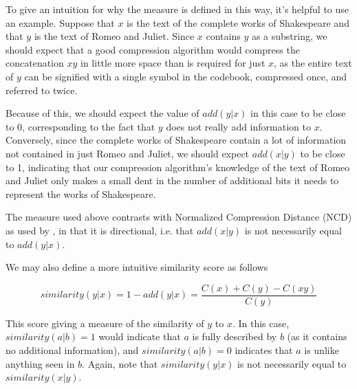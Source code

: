To give an intuition for why the measure is defined in this way, it's helpful to use an example. Suppose that $x$ is the text of the complete works of Shakespeare and that $y$ is the text of Romeo and Juliet. Since $x$ contains $y$ as a substring, we should expect that a good compression algorithm would compress the concatenation $xy$ in little more space than is required for just $x$, as the entire text of $y$ can be signified with a single symbol in the codebook, compressed once, and referred to twice.

Because of this, we should expect the value of $add(y|x)$ in this case to be close to 0, corresponding to the fact that $y$ does not really add information to $x$. Conversely, since the complete works of Shakespeare contain a lot of information not contained in just Romeo and Juliet, we should expect $add(x|y)$ to be close to 1, indicating that our compression algorithm's knowledge of the text of Romeo and Juliet only makes a small dent in the number of additional bits it needs to represent the works of Shakespeare.

The measure used above contrasts with Normalized Compression Distance (NCD) as used by \textcite{li2004similarity} , in that it is directional, i.e. that \(add(x|y)\) is not necessarily equal to \(add(y|x)\).

We may also define a more intuitive similarity score as follows

\[similarity(y|x) = 1 - add(y|x) = \frac{C(x) + C(y) - C(xy)}{C(y)}\]

This score giving a measure of the similarity of \(y\) to \(x\). In this case, $similarity(a|b)=1$ would indicate that $a$ is fully described by $b$ (as it contains no additional information), and $similarity(a|b)=0$ indicates that $a$ is unlike anything seen in $b$. Again, note that \(similarity(y|x)\) is not necessarily equal to \(similarity(x|y)\).

